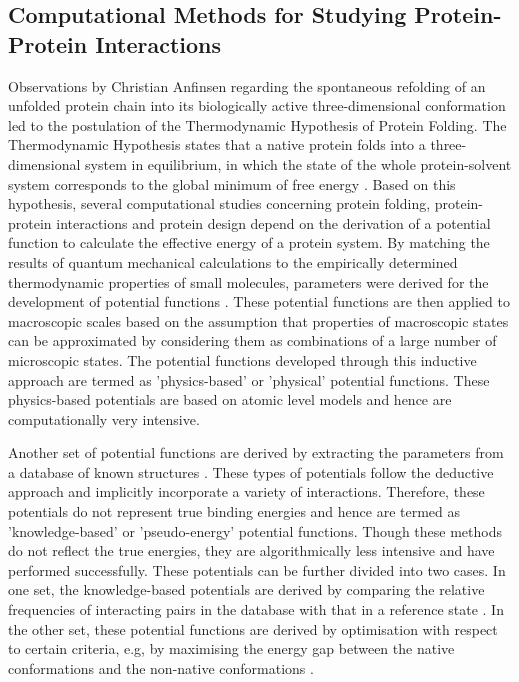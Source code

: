 \subsection{Computational Methods for Studying Protein-Protein Interactions}
Observations by Christian Anfinsen \citep{Anfinsen1973} regarding the spontaneous refolding of an unfolded protein chain into its biologically active three-dimensional conformation led to the postulation of the Thermodynamic Hypothesis of Protein Folding. The Thermodynamic Hypothesis states that a native protein folds into a three-dimensional system in equilibrium, in which the state of the whole protein-solvent system corresponds to the global minimum of free energy \citep{xu2010computational}. Based on this hypothesis, several computational studies concerning protein folding, protein-protein interactions and protein design depend on the derivation of a potential function to calculate the effective energy of a protein system. By matching the results of quantum mechanical calculations to the empirically determined thermodynamic properties of small molecules, parameters were derived for the development of potential functions \citep{Sippl1993}. These potential functions are then applied to macroscopic scales based on the assumption that properties of macroscopic states can be approximated by considering them as combinations of a large number of microscopic states. The potential functions developed through this inductive approach are termed as 'physics-based' or 'physical' potential functions. These physics-based potentials are based on atomic level models and hence are computationally very intensive.

\par
Another set of potential functions are derived by extracting the parameters from a database of known structures \citep{Sippl1993}. These types of potentials follow the deductive approach and implicitly incorporate a variety of interactions. Therefore, these potentials do not represent true binding energies and hence are termed as 'knowledge-based' or 'pseudo-energy' potential functions. Though these methods do not reflect the true energies, they are algorithmically less intensive and have performed successfully. These potentials can be further divided into two cases. In one set, the knowledge-based potentials are derived by comparing the relative frequencies of interacting pairs in the database with that in a reference state \citep{Miyazawa1996}. In the other set, these potential functions are derived by optimisation with respect to certain criteria, e.g, by maximising the energy gap between the native conformations and the non-native conformations \citep{Goldstein1992}.

